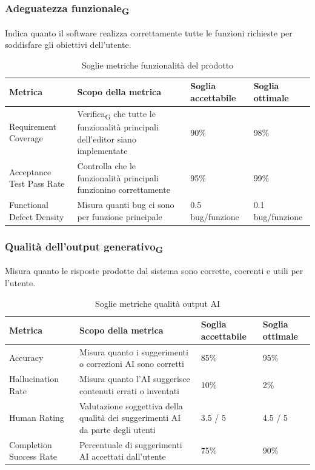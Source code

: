 \documentclass[11pt,a4paper]{article}
\newcommand{\gls}[1]{#1\textsubscript{G}}
\begin{document}
\subsubsection{\gls{Adeguatezza funzionale}}
Indica quanto il software realizza correttamente tutte le funzioni richieste per soddisfare gli obiettivi dell’utente.
\begin{table}[H]
\centering
\renewcommand{\arraystretch}{1.5}
\begin{tabular}{|M{0.25\textwidth}|M{0.35\textwidth}|M{0.15\textwidth}|M{0.15\textwidth}|}
\hline
\textbf{Metrica} & \textbf{Scopo della metrica} & \textbf{Soglia accettabile} & \textbf{Soglia ottimale} \\
\hline
Requirement Coverage & \gls{Verifica} che tutte le funzionalità principali dell’editor siano implementate & 90\% & 98\% \\ \hline
Acceptance Test Pass Rate & Controlla che le funzionalità principali funzionino correttamente & 95\% & 99\% \\ \hline
Functional Defect Density & Misura quanti bug ci sono per funzione principale & 0.5 bug/funzione & 0.1 bug/funzione \\
\hline
\end{tabular}
\caption{Soglie metriche funzionalità del prodotto}
\end{table}

\subsubsection{\gls{Qualità dell'output generativo}}
Misura quanto le risposte prodotte dal sistema sono corrette, coerenti e utili per l’utente.
\begin{table}[H]
\centering
\renewcommand{\arraystretch}{1.5}
\begin{tabular}{|M{0.25\textwidth}|M{0.35\textwidth}|M{0.15\textwidth}|M{0.15\textwidth}|}
\hline
\textbf{Metrica} & \textbf{Scopo della metrica} & \textbf{Soglia accettabile} & \textbf{Soglia ottimale} \\
\hline
Accuracy & Misura quanto i suggerimenti o correzioni AI sono corretti & 85\% & 95\% \\ \hline
Hallucination Rate & Misura quanto l’AI suggerisce contenuti errati o inventati & 10\% & 2\% \\ \hline
Human Rating & Valutazione soggettiva della qualità dei suggerimenti AI da parte degli utenti & 3.5 / 5 & 4.5 / 5 \\ \hline
Completion Success Rate & Percentuale di suggerimenti AI accettati dall’utente & 75\% & 90\% \\
\hline
\end{tabular}
\caption{Soglie metriche qualità output AI}
\end{table}
\end{document}

